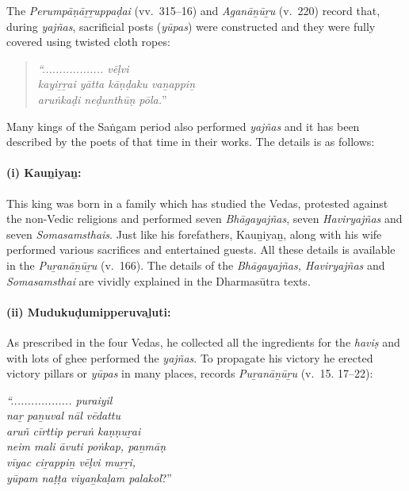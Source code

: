 The \textit{Perumpāṇāṟṟuppaḍai} (vv.~315–16) and \textit{Aganāṉūṟu} (v.~220) record that, during \textit{yajñas}, sacrificial posts (\textit{yūpas}) were constructed and they were fully covered using twisted cloth ropes:

\begin{quote}
\textit{“.................. vēḷvi}\\\textit{kayiṟṟai yātta kāṇḍaku vaṉappiṉ}\\\textit{aruṅkaḍi neḍunthūṇ pōla.}”
\end{quote}

Many kings of the Saṅgam period also performed \textit{yajñas} and it has been described by the poets of that time in their works. The details is as follows:

\paragraph*{(i) Kauṉiyaṉ:}

\vskip -7pt

This king was born in a family which has studied the Vedas, protested against the non-Vedic religions and performed seven \textit{Bhāgayajñas}, seven \textit{Haviryajñas} and seven \textit{Somasamsthais}. Just like his forefathers, Kauṉiyaṉ, along with his wife performed various sacrifices and entertained guests. All these details is available in the \textit{Puṟanāṉūṟu} (v.~166). The details of the \textit{Bhāgayajñas, Haviryajñas} and \textit{Somasamsthai} are vividly explained in the Dharmasūtra texts.


\paragraph*{(ii) Mudukuḍumipperuvaḻuti:}

\vskip -7pt

As prescribed in the four Vedas, he collected all the ingredients for the \textit{haviṣ} and with lots of ghee performed the \textit{yajñas}. To propagate his victory he erected victory pillars or \textit{yūpas} in many places, records \textit{Puṟanāṉūṟu} (v.~15. 17–22):

\textit{“.................. puraiyil}\\\textit{naṟ paṉuval nāl vēdattu}\\\textit{aruñ cīrttip peruṅ kaṇṇuṟai}\\\textit{neim mali āvuti poṅkap, paṉmāṇ}\\\textit{vīyac ciṟappiṉ vēḷvi muṟṟi,}\\\textit{yūpam naṭṭa viyaṉkaḷam palakol}?”

